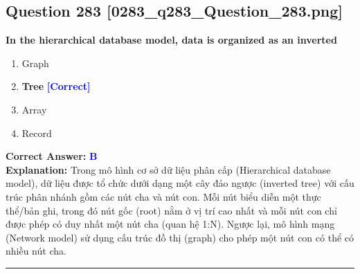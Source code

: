 \documentclass[11pt,a4paper]{article}
\begin{document}
\begin{minipage}{\textwidth}
\subsection*{Question 283 \quad \footnotesize{[0283\_q283\_Question\_283.png]}}
\noindent \textbf{In the hierarchical database model, data is organized as an inverted}

\begin{enumerate}[label=\Alph*.]
    \item Graph
    \item \textbf{Tree} \hfill \textcolor{blue}{\textbf{[Correct]}}
    \item Array
    \item Record
\end{enumerate}

\noindent \textbf{Correct Answer:} \textcolor{blue}{\textbf{B}} \\[2pt]
\noindent \textbf{Explanation:} Trong mô hình cơ sở dữ liệu phân cấp (Hierarchical database model), dữ liệu được tổ chức dưới dạng một cây đảo ngược (inverted tree) với cấu trúc phân nhánh gồm các nút cha và nút con. Mỗi nút biểu diễn một thực thể/bản ghi, trong đó nút gốc (root) nằm ở vị trí cao nhất và mỗi nút con chỉ được phép có duy nhất một nút cha (quan hệ 1:N). Ngược lại, mô hình mạng (Network model) sử dụng cấu trúc đồ thị (graph) cho phép một nút con có thể có nhiều nút cha.

\par\vspace{0.3cm}
\hrule
\vspace{0.3cm}
\end{minipage}
\end{document}
